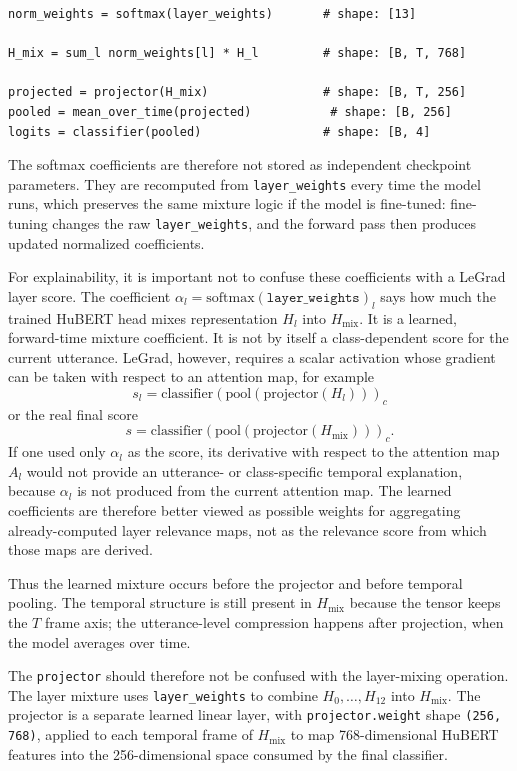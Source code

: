 \documentclass[11pt]{article}
\begin{document}
\begin{verbatim}
norm_weights = softmax(layer_weights)       # shape: [13]

H_mix = sum_l norm_weights[l] * H_l         # shape: [B, T, 768]

projected = projector(H_mix)                # shape: [B, T, 256]
pooled = mean_over_time(projected)           # shape: [B, 256]
logits = classifier(pooled)                 # shape: [B, 4]
\end{verbatim}

The softmax coefficients are therefore not stored as independent checkpoint
parameters. They are recomputed from \texttt{layer\_weights} every time the
model runs, which preserves the same mixture logic if the model is fine-tuned:
fine-tuning changes the raw \texttt{layer\_weights}, and the forward pass then
produces updated normalized coefficients.

For explainability, it is important not to confuse these coefficients with a
LeGrad layer score. The coefficient
$\alpha_l=\mathrm{softmax}(\texttt{layer\_weights})_l$ says how much the
trained HuBERT head mixes representation $H_l$ into $H_{\mathrm{mix}}$. It is a
learned, forward-time mixture coefficient. It is not by itself a
class-dependent score for the current utterance. LeGrad, however, requires a
scalar activation whose gradient can be taken with respect to an attention map,
for example
\[
s_l = \mathrm{classifier}(\mathrm{pool}(\mathrm{projector}(H_l)))_c
\]
or the real final score
\[
s = \mathrm{classifier}(\mathrm{pool}(\mathrm{projector}(H_{\mathrm{mix}})))_c.
\]
If one used only $\alpha_l$ as the score, its derivative with respect to the
attention map $A_l$ would not provide an utterance- or class-specific temporal
explanation, because $\alpha_l$ is not produced from the current attention map.
The learned coefficients are therefore better viewed as possible weights for
aggregating already-computed layer relevance maps, not as the relevance score
from which those maps are derived.

Thus the learned mixture occurs before the projector and before temporal
pooling. The temporal structure is still present in $H_{\mathrm{mix}}$ because
the tensor keeps the $T$ frame axis; the utterance-level compression happens
after projection, when the model averages over time.

The \texttt{projector} should therefore not be confused with the layer-mixing
operation. The layer mixture uses \texttt{layer\_weights} to combine
$H_0,\ldots,H_{12}$ into $H_{\mathrm{mix}}$. The projector is a separate learned
linear layer, with \texttt{projector.weight} shape \texttt{(256, 768)}, applied
to each temporal frame of $H_{\mathrm{mix}}$ to map 768-dimensional HuBERT
features into the 256-dimensional space consumed by the final classifier.
\end{document}
